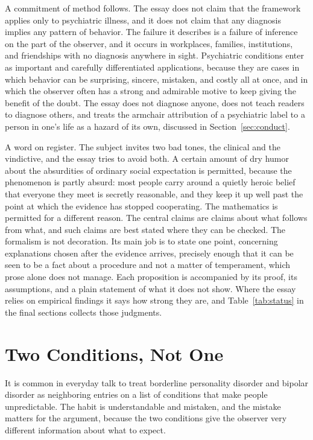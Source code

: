 \documentclass[11pt]{article}
\theoremstyle{definition}
\theoremstyle{remark}
\begin{document}
A commitment of method follows. The essay does not claim that the framework applies only to psychiatric illness, and it does not claim that any diagnosis implies any pattern of behavior. The failure it describes is a failure of inference on the part of the observer, and it occurs in workplaces, families, institutions, and friendships with no diagnosis anywhere in sight. Psychiatric conditions enter as important and carefully differentiated applications, because they are cases in which behavior can be surprising, sincere, mistaken, and costly all at once, and in which the observer often has a strong and admirable motive to keep giving the benefit of the doubt. The essay does not diagnose anyone, does not teach readers to diagnose others, and treats the armchair attribution of a psychiatric label to a person in one's life as a hazard of its own, discussed in Section~\ref{sec:conduct}.

A word on register. The subject invites two bad tones, the clinical and the vindictive, and the essay tries to avoid both. A certain amount of dry humor about the absurdities of ordinary social expectation is permitted, because the phenomenon is partly absurd: most people carry around a quietly heroic belief that everyone they meet is secretly reasonable, and they keep it up well past the point at which the evidence has stopped cooperating. The mathematics is permitted for a different reason. The central claims are claims about what follows from what, and such claims are best stated where they can be checked. The formalism is not decoration. Its main job is to state one point, concerning explanations chosen after the evidence arrives, precisely enough that it can be seen to be a fact about a procedure and not a matter of temperament, which prose alone does not manage. Each proposition is accompanied by its proof, its assumptions, and a plain statement of what it does not show. Where the essay relies on empirical findings it says how strong they are, and Table~\ref{tab:status} in the final sections collects those judgments.

\section{Two Conditions, Not One}\label{sec:conditions}

It is common in everyday talk to treat borderline personality disorder and bipolar disorder as neighboring entries on a list of conditions that make people unpredictable. The habit is understandable and mistaken, and the mistake matters for the argument, because the two conditions give the observer very different information about what to expect.
\end{document}

